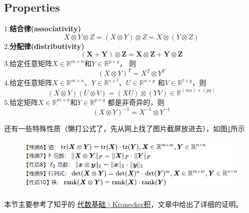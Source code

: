 \documentclass[lang=cn,10pt]{elegantbook}
\begin{document}
\subsection*{Properties}
\noindent
\textbf{$\mathit{1.}$结合律(associativity)}
\begin{equation}
	X\otimes Y\otimes Z=(X\otimes Y)\otimes Z=X\otimes(Y\otimes Z)
\end{equation}
\textbf{$\mathit{2.}$分配律(distributivity)}
\begin{equation}
	(\boldsymbol{X}+\boldsymbol{Y})\otimes\boldsymbol{Z}=\boldsymbol{X}\otimes\boldsymbol{Z}+\boldsymbol{Y}\otimes\boldsymbol{Z}
\end{equation}
\textbf{$\mathit{3.}$}给定任意矩阵$X \in \mathbb{R}^{m \times n}$和$Y \in \mathbb{R}^{p \times q}$，
则
\begin{equation}
	(X \otimes Y)^T = X^T \otimes Y^T
\end{equation}
\textbf{$\mathit{4.}$}给定任意矩阵$X\in \mathbb{R}^{m\times n}\text{、}Y\in \mathbb{R}^{s\times t}\text{、}U\in \mathbb{R}^{n\times p}$
和$V\in \mathbb{R}^{t\times q}$，则
\begin{equation}
	\left( X\otimes Y \right) \left( U\otimes V \right) =\left( XU \right) \otimes \left( YV \right) \in \mathbb{R}^{\left( ms \right) \times \left( pq \right)}
\end{equation}
\textbf{$\mathit{5.}$}给定矩阵$X \in \mathbb{R}^{m \times n}$和$Y \in \mathbb{R}^{p \times q}$
都是非奇异的，则
\begin{equation}
	(X \otimes Y)^{-1} = X^{-1} \otimes Y^{-1}
\end{equation}
\par 还有一些特殊性质（懒打公式了，先从网上找了图片截屏放进去），如图\ref{Kronecker}所示
\begin{figure}[h]
	\centering
	\includegraphics[scale=0.8]{img/Kronecker.png}
	\caption{}
	\label{Kronecker}
\end{figure}

本节主要参考了知乎的
\href{https://zhuanlan.zhihu.com/p/139335389}{代数基础 | Kronecker积}，文章中给出了详细的证明。
\end{document}
